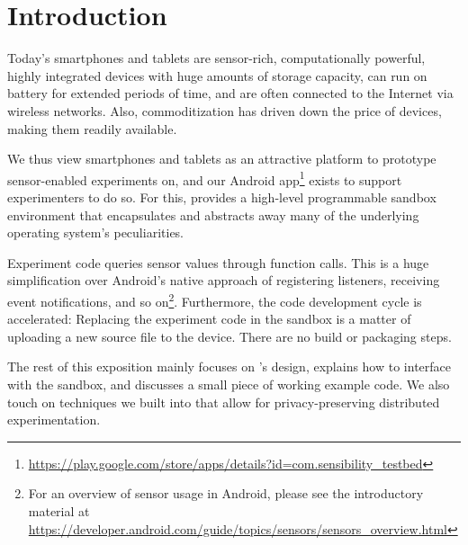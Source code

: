 \section{Introduction}

Today's smartphones and tablets are sensor-rich, computationally 
powerful, highly integrated devices with huge amounts of storage 
capacity, can run on battery for extended periods of time, and are often 
connected to the Internet via wireless networks.
Also, commoditization has driven down the price of devices, making them 
readily available.

We thus view smartphones and tablets as an attractive platform to 
prototype sensor-enabled experiments on, and our \sys Android 
app\footnote{\url{https://play.google.com/store/apps/details?id=com.sensibility_testbed}} 
exists to support experimenters to do so. For this, \sys provides a 
high-level programmable sandbox environment that encapsulates and 
abstracts away many of the underlying operating system's peculiarities. 

Experiment code queries sensor values through function calls. 
This is a huge simplification over Android's native approach of registering 
listeners, receiving event notifications, and so on\footnote{For an overview of sensor usage in Android, please see the introductory material at \url{https://developer.android.com/guide/topics/sensors/sensors_overview.html}}.
Furthermore, the code development cycle is accelerated: Replacing the 
experiment code in the sandbox is a matter of uploading a new source 
file to the device. There are no build or packaging steps.

The rest of this exposition mainly focuses on \sys's design, 
explains how to interface with the sandbox, and discusses a small piece 
of working example code. We also touch on techniques we built into \sys 
that allow for privacy-preserving distributed experimentation.
